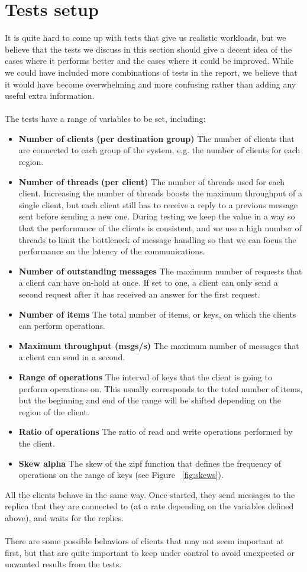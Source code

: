 \section{Tests setup}\label{sec:tests-setup}
It is quite hard to come up with tests that give us realistic workloads, but we believe that the tests we discuss in this section should give a decent idea of the cases where it performs better and the cases where it could be improved. While we could have included more combinations of tests in the report, we believe that it would have become overwhelming and more confusing rather than adding any useful extra information.
\\\\
The tests have a range of variables to be set, including:
\begin{itemize}
  \item \textbf{Number of clients (per destination group)} The number of clients that are connected to each group of the system, e.g. the number of clients for each region.
  \item \textbf{Number of threads (per client)} The number of threads used for each client. Increasing the number of threads boosts the maximum throughput of a single client, but each client still has to receive a reply to a previous message sent before sending a new one. During testing we keep the value in a way so that the performance of the clients is consistent, and we use a high number of threads to limit the bottleneck of message handling so that we can focus the performance on the latency of the communications.
  \item \textbf{Number of outstanding messages} The maximum number of requests that a client can have on-hold at once. If set to one, a client can only send a second request after it has received an answer for the first request.
  \item \textbf{Number of items} The total number of items, or keys, on which the clients can perform operations.
  \item \textbf{Maximum throughput (msgs/s)} The maximum number of messages that a client can send in a second.
  \item \textbf{Range of operations} The interval of keys that the client is going to perform operations on. This usually corresponds to the total number of items, but the beginning and end of the range will be shifted depending on the region of the client.
  \item \textbf{Ratio of operations} The ratio of read and write operations performed by the client.
  \item \textbf{Skew alpha} The skew of the zipf\citep{zipf} function that defines the frequency of operations on the range of keys (see Figure ~\ref{fig:skews}).
\end{itemize}
All the clients behave in the same way. Once started, they send messages to the replica that they are connected to (at a rate depending on the variables defined above), and waits for the replies.
\\\\
There are some possible behaviors of clients that may not seem important at first, but that are quite important to keep under control to avoid unexpected or unwanted results from the tests.

